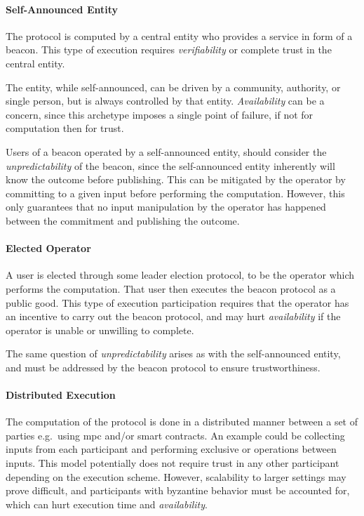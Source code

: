 \paragraph{Self-Announced Entity}
    The protocol is computed by a central entity who provides a service in form of a beacon.
    This type of execution requires \emph{verifiability} or complete trust in the central entity.

    The entity, while self-announced, can be driven by a community, authority, or single person, but is always controlled by that entity.
    \emph{Availability} can be a concern, since this archetype imposes a single point of failure, if not for computation then for trust.

    Users of a beacon operated by a self-announced entity, should consider the \emph{unpredictability} of the beacon, since the self-announced entity inherently will know the outcome before publishing.
    This can be mitigated by the operator by committing to a given input before performing the computation.
    However, this only guarantees that no input manipulation by the operator has happened between the commitment and publishing the outcome.

\paragraph{Elected Operator}
    A user is elected through some leader election protocol, to be the operator which performs the computation.
    That user then executes the beacon protocol as a public good.
    This type of execution participation requires that the operator has an incentive to carry out the beacon protocol, and may hurt \emph{availability} if the operator is unable or unwilling to complete.

    The same question of \emph{unpredictability} arises as with the self-announced entity, and must be addressed by the beacon protocol to ensure trustworthiness.

\paragraph{Distributed Execution}
    The computation of the protocol is done in a distributed manner between a set of parties e.g.\ using \gls{mpc} and/or smart contracts.
    An example could be collecting inputs from each participant and performing exclusive or operations between inputs.
    This model potentially does not require trust in any other participant depending on the execution scheme.
    However, scalability to larger settings may prove difficult, and participants with byzantine behavior must be accounted for, which can hurt execution time and \emph{availability}.

